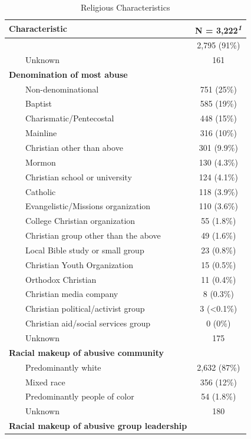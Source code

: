 \documentclass[
  letterpaper,
]{article}
\begin{document}
\begin{longtable}{lc}

\caption{\label{tbl-ReligTable}Religious Characteristics}

\tabularnewline

\toprule
\textbf{Characteristic} & \textbf{N = 3,222}\textsuperscript{\textit{1}} \\ 
\midrule\addlinespace[2.5pt]
{\bfseries Raised in Christian home} & 2,795 (91\%) \\ 
    Unknown & 161 \\ 
{\bfseries Denomination of most abuse} &  \\ 
    Non-denominational & 751 (25\%) \\ 
    Baptist & 585 (19\%) \\ 
    Charismatic/Pentecostal & 448 (15\%) \\ 
    Mainline & 316 (10\%) \\ 
    Christian other than above & 301 (9.9\%) \\ 
    Mormon & 130 (4.3\%) \\ 
    Christian school or university & 124 (4.1\%) \\ 
    Catholic & 118 (3.9\%) \\ 
    Evangelistic/Missions organization & 110 (3.6\%) \\ 
    College Christian organization & 55 (1.8\%) \\ 
    Christian group other than the above & 49 (1.6\%) \\ 
    Local Bible study or small group & 23 (0.8\%) \\ 
    Christian Youth Organization & 15 (0.5\%) \\ 
    Orthodox Christian & 11 (0.4\%) \\ 
    Christian media company & 8 (0.3\%) \\ 
    Christian political/activist group & 3 (<0.1\%) \\ 
    Christian aid/social services group & 0 (0\%) \\ 
    Unknown & 175 \\ 
{\bfseries Racial makeup of abusive community} &  \\ 
    Predominantly white & 2,632 (87\%) \\ 
    Mixed race & 356 (12\%) \\ 
    Predominantly people of color & 54 (1.8\%) \\ 
    Unknown & 180 \\ 
{\bfseries Racial makeup of abusive group leadership} &  \\ 

\end{longtable}
\end{document}
